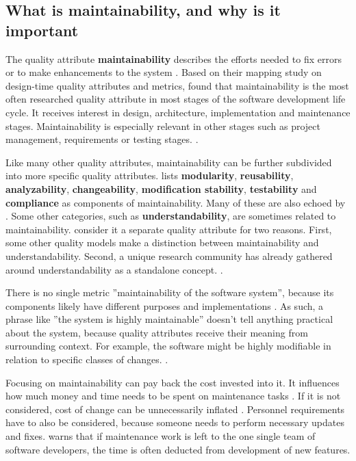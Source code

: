 \documentclass[utf8,english]{gradu3}
\begin{document}
\subsection{What is maintainability, and why is it important}

The quality attribute \textbf{maintainability} describes the efforts needed to
fix errors or to make enhancements to the system \parencite[603]{Gorla2010}.
Based on their mapping study on design-time quality attributes and metrics,
\textcite{Arvanitou2017} found that maintainability is the most often researched
quality attribute in most stages of the software development life cycle. It
receives interest in design, architecture, implementation and maintenance
stages. Maintainability is especially relevant in other stages such as project
management, requirements or testing stages. \parencite[61-62]{Arvanitou2017}.

Like many other quality attributes, maintainability can be further subdivided
into more specific quality attributes. \textcite[233]{ISO5055} lists
\textbf{modularity}, \textbf{reusability}, \textbf{analyzability},
\textbf{changeability}, \textbf{modification stability}, \textbf{testability}
and \textbf{compliance} as components of maintainability. Many of these are also
echoed by \textcite[61]{Arvanitou2017}. Some other categories, such as
\textbf{understandability}, are sometimes related to maintainability.
\textcite{Arvanitou2017} consider it a separate quality attribute for two
reasons. First, some other quality models make a distinction between
maintainability and understandability. Second, a unique research community has
already gathered around understandability as a standalone concept.
\parencite[61]{Arvanitou2017}.

There is no single metric ''maintainability of the software system'', because
its components likely have different purposes and implementations
\parencites[26]{Broy2006}[192]{Bass1998}. As such, a phrase like ''the system is
highly maintainable'' doesn't tell anything practical about the system, because
quality attributes receive their meaning from surrounding context. For example,
the software might be highly modifiable in relation to specific classes of
changes. \parencite[192]{Bass1998}.

Focusing on maintainability can pay back the cost invested into it. It
influences how much money and time needs to be spent on maintenance tasks
\parencite[21]{Broy2006}. If it is not considered, cost of change can be
unnecessarily inflated \parencite[2]{Vale2022}. Personnel requirements have to
also be considered, because someone needs to perform necessary updates and
fixes. \textcite{Heroku2011} warns that if maintenance work is left to the one
single team of software developers, the time is often deducted from development
of new features.
\end{document}
